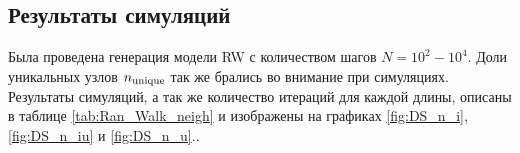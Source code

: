 \subsection{Результаты симуляций}

Была проведена генерация модели RW с количеством шагов $N = 10^{2}-10^{4}$. 
Доли уникальных узлов $n_{\textup{unique}}$ так же брались во внимание при симуляциях. 
Результаты симуляций, а так же количество итераций для каждой длины, описаны в таблице \ref{tab:Ran_Walk_neigh} и изображены на графиках \ref{fig:DS_n_i}, \ref{fig:DS_n_iu} и \ref{fig:DS_n_u}.\footnotemark{}.

